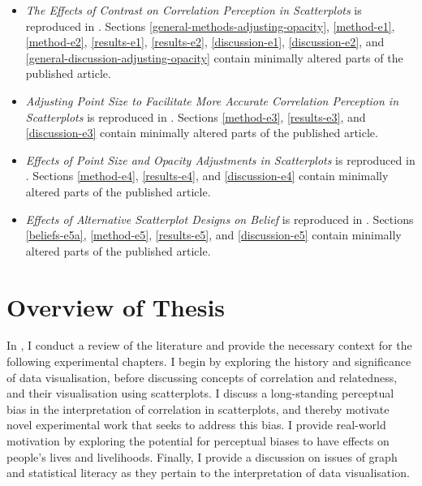 \documentclass[../main.tex]{subfiles}
\begin{document}
\begin{itemize}
\item
  \emph{The Effects of Contrast on Correlation Perception in
  Scatterplots} \cite{strain_2023} is reproduced in
  . Sections
  \ref{general-methods-adjusting-opacity}, \ref{method-e1},
  \ref{method-e2}, \ref{results-e1}, \ref{results-e2},
  \ref{discussion-e1}, \ref{discussion-e2}, and
  \ref{general-discussion-adjusting-opacity} contain minimally altered
  parts of the published article.
\item
  \emph{Adjusting Point Size to Facilitate More Accurate Correlation
  Perception in Scatterplots} \cite{strain_2023b} is reproduced in
  . Sections \ref{method-e3},
  \ref{results-e3}, and \ref{discussion-e3} contain minimally altered
  parts of the published article.
\item
  \emph{Effects of Point Size and Opacity Adjustments in Scatterplots}
  \cite{strain_2024} is reproduced in
  . Sections \ref{method-e4},
  \ref{results-e4}, and \ref{discussion-e4} contain minimally altered
  parts of the published article.
\item
  \emph{Effects of Alternative Scatterplot Designs on Belief}
  \cite{strain_2025} is reproduced in .
  Sections \ref{beliefs-e5a}, \ref{method-e5}, \ref{results-e5}, and
  \ref{discussion-e5} contain minimally altered parts of the published
  article.
\end{itemize}

\section{Overview of Thesis}\label{overview-of-thesis}

In , I conduct a review of the literature and
provide the necessary context for the following experimental chapters. I
begin by exploring the history and significance of data visualisation,
before discussing concepts of correlation and relatedness, and their
visualisation using scatterplots. I discuss a long-standing perceptual
bias in the interpretation of correlation in scatterplots, and thereby
motivate novel experimental work that seeks to address this bias. I
provide real-world motivation by exploring the potential for perceptual
biases to have effects on people's lives and livelihoods. Finally, I
provide a discussion on issues of graph and statistical literacy as they
pertain to the interpretation of data visualisation.
\end{document}
